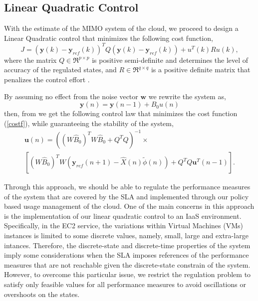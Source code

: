 \documentclass{sig-alternate}
\begin{document}
\subsection{Linear Quadratic Control}
With the estimate of the MIMO system of the cloud, we proceed to design a Linear Quadratic control that minimizes the 
following cost function,
\begin{equation}
 J = (\mathbf{y}(k)-\mathbf{y}_{ref}(k))^{T}Q(\mathbf{y}(k)-\mathbf{y}_{ref}(k)) + u^{T}(k)Ru(k), \label{costf}
\end{equation}
where the matrix $Q \in \Re^{p \times p}$ is positive semi-definite and determines the level of accuracy of the regulated 
states, and $R \in \Re^{q \times q}$ is a positive definite matrix that penalizes the control effort \cite{Dorato-2000}.

By assuming no effect from the noise vector $\mathbf{w}$ we rewrite the system as,
\begin{displaymath}
 \mathbf{y}(n) = \mathbf{y}(n-1) + B_{0}u(n)
\end{displaymath}
then, from \cite{Liu-2007} we get the following control law that minimizes the cost function (\ref{costf}), while guaranteeing the stability
of the system,
\begin{eqnarray}
 &\mathbf{u}(n) = \left( (W\hat{B}_{0})^{T}W\hat{B}_{0}+Q^{T}Q \right)^{-1} \times& \nonumber \\ 
 &\left[ (W\hat{B}_{0})^{T}W \left(\mathbf{y}_{ref}(n+1) -\hat{X}(n)\tilde{\phi}(n) \right) + Q^{T}Q \mathbf{u}^{T}(n-1) \right].& \nonumber
\end{eqnarray}

Through this approach, we should be able to regulate the performance measures of the system that are covered by the
SLA and implemented through our policy based usage management of the cloud. One of the main concerns in this approach is the
implementation of our linear quadratic control to an IaaS environment. 
Specifically, in the EC2 service, the variations within Virtual Machines (VMs) instances
is limited to some discrete values, namely, small, large and extra-large intances. Therefore, the discrete-state and
discrete-time properties of the system imply some considerations when the SLA imposes references of the 
performance measures that are not reachable given the discrete-state constrain of the system. However, to overcome 
this particular issue, we restrict the regulation problem to satisfy only feasible values for all performance measures to
avoid oscillations or overshoots on the states.
\end{document}
